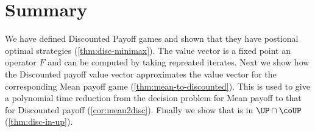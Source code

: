 \section{Summary}
We have defined Discounted Payoff games and shown that they have postional optimal strategies (\autoref{thm:disc-minimax}). The value vector is a fixed point an operator $F$ and can be computed by taking repreated iterates. Next we show how the Discounted payoff value vector approximates the value vector for the corresponding Mean payoff game (\autoref{thm:mean-to-discounted}). This is used to give a polynomial time reduction from the decision problem for Mean payoff  to that for Discounted payoff  (\autoref{cor:mean2disc}). Finally we show that  is in $\UP \cap \coUP$ (\autoref{thm:disc-in-up}).
